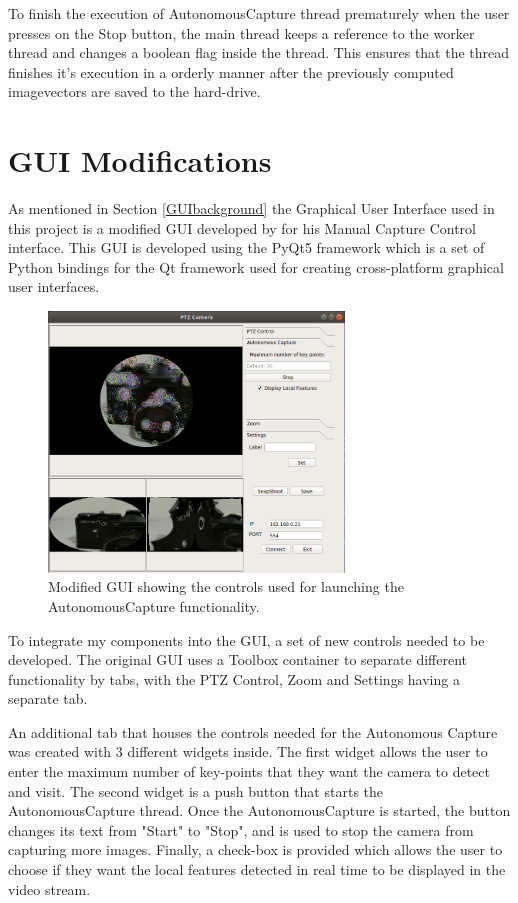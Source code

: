 \documentclass{l4proj}
\begin{document}
To finish the execution of AutonomousCapture thread prematurely when the user presses on the Stop button, the main thread keeps a reference to the worker thread and changes a boolean flag inside the thread. This ensures that the thread finishes it's execution in a orderly manner after the previously computed imagevectors are saved to the hard-drive. 







\section{GUI Modifications}

As mentioned in Section \ref{GUIbackground} the Graphical User Interface used in this project is a modified GUI developed by \citet{JianwenZhou} for his Manual Capture Control interface. This GUI is developed using the PyQt5 framework which is a set of Python bindings for the Qt framework used for creating cross-platform graphical user interfaces. 

\begin{figure}[h]
    \centering
    \includegraphics[width=0.7\textwidth]{l4template-master/images/guimodified.png}
    \caption{Modified GUI showing the controls used for launching the AutonomousCapture functionality.}
    \label{modifiedgui}
\end{figure}

To integrate my components into the GUI, a set of new controls needed to be developed. The original GUI uses a Toolbox container to separate different functionality by tabs, with the PTZ Control, Zoom and Settings having a separate tab. 

An additional tab that houses the controls needed for the Autonomous Capture was created with 3 different widgets inside. The first widget allows the user to enter the maximum number of key-points that they want the camera to detect and visit. The second widget is a push button that starts the AutonomousCapture thread. Once the AutonomousCapture is started, the button changes its text from "Start" to "Stop", and is used to stop the camera from capturing more images.   Finally, a check-box is provided which allows the user to choose if they want the local features detected in real time to be displayed in the video stream. 
\end{document}
